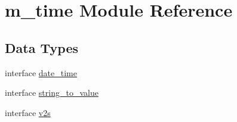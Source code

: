\hypertarget{namespacem__time}{}\section{m\+\_\+time Module Reference}
\label{namespacem__time}
\subsection*{Data Types}
\begin{DoxyCompactItemize}
\item 
interface \mbox{\hyperlink{structm__time_1_1date__time}{date\+\_\+time}}
\item 
interface \mbox{\hyperlink{interfacem__time_1_1string__to__value}{string\+\_\+to\+\_\+value}}
\item 
interface \mbox{\hyperlink{interfacem__time_1_1v2s}{v2s}}
\end{DoxyCompactItemize}
